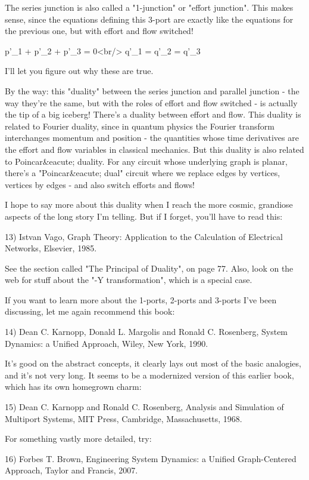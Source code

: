 The series junction is also called a "1-junction" or "effort
junction".  This makes sense, since the equations defining this 3-port
are exactly like the equations for the previous one, but with effort
and flow switched!

  p'_{1} + p'_{2} + p'_{3} = 0<br/>
  q'_{1} = q'_{2} = q'_{3}

I'll let you figure out why these are true.  

By the way: this "duality" between the series junction and
parallel junction - the way they're the same, but with the roles of
effort and flow switched - is actually the tip of a big iceberg!
There's a duality between effort and flow.  This duality is related to
Fourier duality, since in quantum physics the Fourier transform
interchanges momentum and position - the quantities whose time
derivatives are the effort and flow variables in classical mechanics.
But this duality is also related to Poincar&eacute; duality.  For any
circuit whose underlying graph is planar, there's a
"Poincar&eacute; dual" circuit where we replace edges by
vertices, vertices by edges - and also switch efforts and flows!

I hope to say more about this duality when I reach the more cosmic,
grandiose aspects of the long story I'm telling.  But if I forget,
you'll have to read this:

13) Istvan Vago, Graph Theory: Application to the Calculation of
Electrical Networks, Elsevier, 1985.  

See the section called "The Principal of Duality", on page 77.
Also, look on the web for stuff about the "\Delta -Y transformation",
which is a special case.

If you want to learn more about the 1-ports, 2-ports and 3-ports I've
been discussing, let me again recommend this book:

14) Dean C. Karnopp, Donald L. Margolis and Ronald C. Rosenberg,
System Dynamics: a Unified Approach, Wiley, New York, 1990.

It's good on the abstract concepts, it clearly lays out most of the
basic analogies, and it's not very long.  It seems to be a modernized
version of this earlier book, which has its own homegrown charm:

15) Dean C. Karnopp and Ronald C. Rosenberg, Analysis and Simulation of
Multiport Systems, MIT Press, Cambridge, Massachusetts, 1968.

For something vastly more detailed, try:

16) Forbes T. Brown, Engineering System Dynamics: a Unified 
Graph-Centered Approach, Taylor and Francis, 2007.

